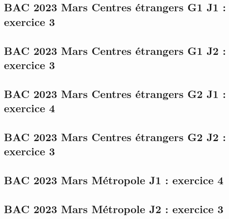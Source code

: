 \documentclass[lang=fr,edition=teacher,layout=sheet]{mxbook}
\begin{document}
\begingroup\endgroup
\par\bigskip
{}\subsection*{BAC 2023 Mars Centres étrangers G1 J1 : exercice 3}
\begingroup\endgroup
\par\bigskip
{}\subsection*{BAC 2023 Mars Centres étrangers G1 J2 : exercice 3}
\begingroup\endgroup
\par\bigskip
{}\subsection*{BAC 2023 Mars Centres étrangers G2 J1 : exercice 4}
\begingroup\endgroup
\par\bigskip
{}\subsection*{BAC 2023 Mars Centres étrangers G2 J2 : exercice 3}
\begingroup\endgroup
\par\bigskip
{}\subsection*{BAC 2023 Mars Métropole J1 : exercice 4}
\begingroup\endgroup
\par\bigskip
{}\subsection*{BAC 2023 Mars Métropole J2 : exercice 3}
\begingroup\endgroup
\par\bigskip
\end{document}
